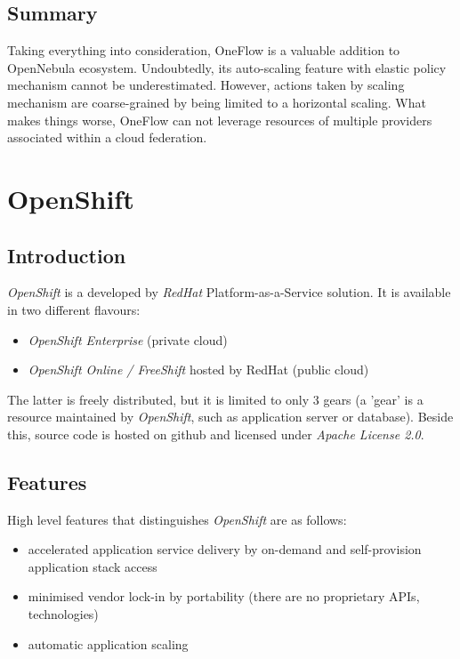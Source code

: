 \subsection{Summary}
Taking everything into consideration, OneFlow is a valuable addition to OpenNebula ecosystem. Undoubtedly, its auto-scaling feature with elastic policy mechanism cannot be underestimated. However, actions taken by scaling mechanism are coarse-grained by being limited to a horizontal scaling. What makes things worse, OneFlow can not leverage resources of multiple providers associated within a cloud federation.

\section{OpenShift}

\subsection{Introduction}
\emph{OpenShift} is a developed by \emph{RedHat} Platform-as-a-Service solution. It is available in two different flavours:
\begin{itemize}
 \item \emph{OpenShift Enterprise} (private cloud)
 \item \emph{OpenShift Online / FreeShift} hosted by RedHat (public cloud)
\end{itemize}

The latter is freely distributed, but it is limited to only 3 gears (a 'gear' is a resource maintained by \emph{OpenShift}, such as application server or database). Beside this, source code is hosted on github and licensed under \emph{Apache License 2.0}.

\subsection{Features}
High level features that distinguishes \emph{OpenShift} are as follows:
\begin{itemize}
  \item accelerated application service delivery by on-demand and self-provision application stack access
  \item minimised vendor lock-in by portability (there are no proprietary APIs, technologies)
  \item automatic application scaling
\end{itemize}

